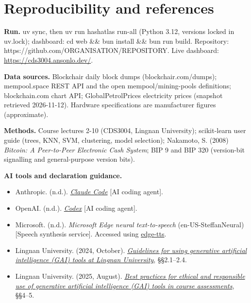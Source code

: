 \documentclass[
  11pt,
  a4paper,
]{article}
\providecommand{\tightlist}{%
  \setlength{\itemsep}{0pt}\setlength{\parskip}{0pt}}
\newcommand{\code}[1]{{\ttfamily\color{ReportInkTwo}#1}}
\begin{document}
\section{Reproducibility and
references}\label{reproducibility-and-references}

\textbf{Run.} \code{uv sync}, then \code{uv run hashatlas run-all}
(Python 3.12, versions locked in \code{uv.\allowbreak{}lock});
dashboard: \code{cd web \&\& bun install \&\& bun run build}.
Repository: https://github.com/ORGANISATION/REPOSITORY. Live dashboard:
\url{https://cds3004.ansonlo.dev/}.

\textbf{Data sources.} Blockchair daily block dumps
(blockchair.com/dumps); mempool.space REST API and the open
\code{mempool/\allowbreak{}mining-pools} definitions; blockchain.com
chart API; GlobalPetrolPrices electricity prices (snapshot retrieved
2026-11-12). Hardware specifications are manufacturer figures
(approximate).

\textbf{Methods.} Course lectures 2-10 (CDS3004, Lingnan University);
scikit-learn user guide (trees, KNN, SVM, clustering, model selection);
Nakamoto, S. (2008) \emph{Bitcoin: A Peer-to-Peer Electronic Cash
System}; BIP 9 and BIP 320 (version-bit signalling and general-purpose
version bits).

\textbf{AI tools and declaration guidance.}

\begin{itemize}
\tightlist
\item
  Anthropic. (n.d.).
  \href{https://code.claude.com/docs/en/overview}{\emph{Claude Code}}
  {[}AI coding agent{]}.
\item
  OpenAI. (n.d.). \href{https://openai.com/codex/}{\emph{Codex}} {[}AI
  coding agent{]}.
\item
  Microsoft. (n.d.). \emph{Microsoft Edge neural text-to-speech}
  (en-US-SteffanNeural) {[}Speech synthesis service{]}. Accessed using
  \href{https://github.com/rany2/edge-tts}{edge-tts}.
\item
  Lingnan University. (2024, October).
  \href{https://www.ln.edu.hk/tlc/f/page/107180/326402/Guidelines\%20for\%20Using\%20GAI\%20Tools\%20\%28Oct\%202024\%29.pdf}{\emph{Guidelines
  for using generative artificial intelligence (GAI) tools at Lingnan
  University}}, §§2.1--2.4.
\item
  Lingnan University. (2025, August).
  \href{https://www.ln.edu.hk/tlc/f/page/107180/348570/Best\%20Practices\%20for\%20Ethicial\%20and\%20Responsibilities\%20Use\%20of\%20GAI\%20\%28Aug\%202025\%29.pdf}{\emph{Best
  practices for ethical and responsible use of generative artificial
  intelligence (GAI) tools in course assessments}}, §§4--5.
\end{itemize}
\end{document}
